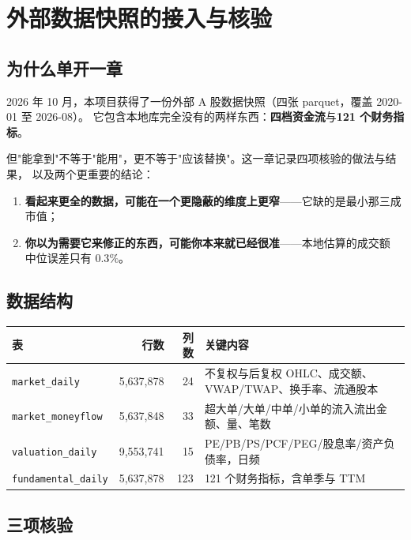 \chapter{外部数据快照的接入与核验}\label{app:shm}

\section{为什么单开一章}

2026 年 10 月，本项目获得了一份外部 A 股数据快照（四张 parquet，覆盖 2020-01 至 2026-08）。
它包含本地库完全没有的两样东西：\textbf{四档资金流}与\textbf{121 个财务指标}。

但"能拿到"不等于"能用"，更不等于"应该替换"。这一章记录四项核验的做法与结果，
以及两个更重要的结论：

\begin{enumerate}
  \item \textbf{看起来更全的数据，可能在一个更隐蔽的维度上更窄}——它缺的是最小那三成市值；
  \item \textbf{你以为需要它来修正的东西，可能你本来就已经很准}——本地估算的成交额
        中位误差只有 $0.3\%$。
\end{enumerate}

\section{数据结构}

\begin{center}
\begin{tabularx}{\textwidth}{@{}lrrX@{}}
\toprule
表 & 行数 & 列数 & 关键内容 \\
\midrule
\texttt{market\_daily} & 5,637,878 & 24 & 不复权与后复权 OHLC、成交额、VWAP/TWAP、换手率、流通股本 \\
\texttt{market\_moneyflow} & 5,637,848 & 33 & 超大单/大单/中单/小单的流入流出金额、量、笔数 \\
\texttt{valuation\_daily} & 9,553,741 & 15 & PE/PB/PS/PCF/PEG/股息率/资产负债率，日频 \\
\texttt{fundamental\_daily} & 5,637,878 & 123 & 121 个财务指标，含单季与 TTM \\
\bottomrule
\end{tabularx}
\end{center}

\section{三项核验}

